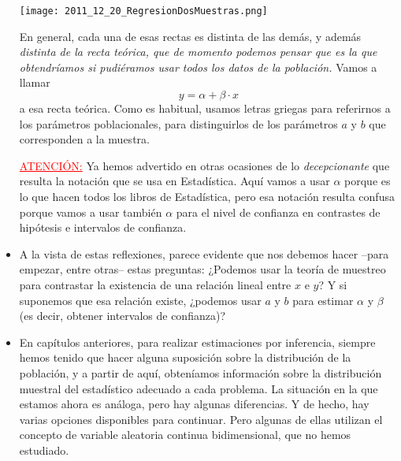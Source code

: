 \begin{itemize}
    \begin{center}
    \texttt{[image: 2011\_12\_20\_RegresionDosMuestras.png]}
    \end{center}
    En general, cada una de esas rectas es distinta de las demás, y además {\em distinta de la {\sf recta teórica}, que de momento podemos pensar que es la que obtendríamos si pudiéramos usar todos los datos de la población.} Vamos a llamar
    \[y=\alpha +\beta\cdot x\]
    a esa recta teórica. Como es habitual, usamos letras griegas para referirnos a los parámetros poblacionales, para distinguirlos de los parámetros $a$ y $b$ que corresponden a la muestra.

    \textcolor{red}{\underline{ATENCIÓN:}} Ya hemos advertido en otras ocasiones de lo {\em decepcionante} que resulta la notación que se usa en Estadística. Aquí vamos a usar $\alpha$ porque es lo que hacen todos los libros de Estadística, pero esa notación resulta confusa porque vamos a usar también $\alpha$ para el nivel de confianza en contrastes de hipótesis e intervalos de confianza.

    \item A la vista de estas reflexiones, parece evidente que nos debemos hacer --para empezar, entre otras-- estas preguntas: ¿Podemos usar la teoría de muestreo para contrastar la existencia de una relación lineal entre $x$ e $y$? Y si suponemos que esa relación existe, ¿podemos usar $a$ y $b$ para estimar $\alpha$ y $\beta$ (es decir, obtener intervalos de confianza)?

    \item En capítulos anteriores, para realizar estimaciones por inferencia, siempre hemos tenido que hacer alguna suposición sobre la distribución de la población, y a partir de aquí, obteníamos información sobre la distribución muestral del estadístico adecuado a cada problema. La situación en la que estamos ahora es análoga, pero hay algunas diferencias. Y de hecho, hay varias opciones disponibles para continuar. Pero algunas de ellas utilizan el concepto de {\sf variable aleatoria continua bidimensional}, que no hemos estudiado.



\end{itemize}
